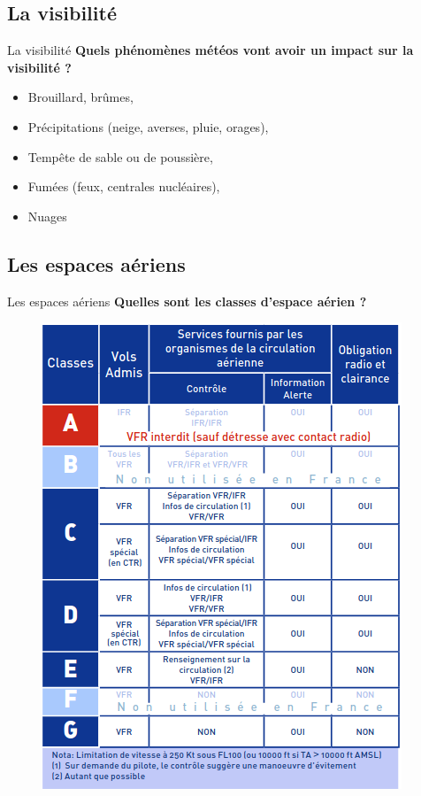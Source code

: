 \documentclass{beamer}
\begin{document}
\subsection{La visibilité}
\begin{frame}{La visibilité}
  \textbf{Quels phénomènes météos vont avoir un impact sur la visibilité ?}
  
  \begin{itemize}
    \item Brouillard, brûmes, \pause
    \item Précipitations (neige, averses, pluie, orages), \pause
    \item Tempête de sable ou de poussière, \pause
    \item Fumées (feux, centrales nucléaires), \pause
    \item Nuages \pause
  \end{itemize}

\end{frame}

\subsection{Les espaces aériens}
\begin{frame}{Les espaces aériens}
  \textbf{Quelles sont les classes d'espace aérien ?}

  \pause
  \begin{figure}
    \centering
    \includegraphics[scale=1.41]{images/espaces-aeriens.png}
  \end{figure}
\end{frame}
\end{document}
